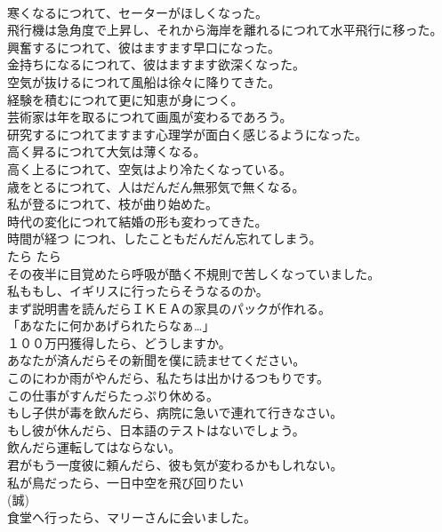 \documentclass[8pt]{extreport}
\begin{document}
\begin{CJK}{UTF8}{min}
\\	寒くなるにつれて、セーターがほしくなった。  
\\	飛行機は急角度で上昇し、それから海岸を離れるにつれて水平飛行に移った。   
\\	興奮するにつれて、彼はますます早口になった。   
\\	金持ちになるにつれて、彼はますます欲深くなった。   
\\	空気が抜けるにつれて風船は徐々に降りてきた。   
\\	経験を積むにつれて更に知恵が身につく。   
\\	芸術家は年を取るにつれて画風が変わるであろう。   
\\	研究するにつれてますます心理学が面白く感じるようになった。   
\\	高く昇るにつれて大気は薄くなる。   
\\	高く上るにつれて、空気はより冷たくなっている。   
\\	歳をとるにつれて、人はだんだん無邪気で無くなる。   
\\	私が登るにつれて、枝が曲り始めた。   
\\	時代の変化につれて結婚の形も変わってきた。  
\\	時間が経つ につれ、したこともだんだん忘れてしまう。  
\\	たら	たら	
\\	その夜半に目覚めたら呼吸が酷く不規則で苦しくなっていました。  
\\	私ももし、イギリスに行ったらそうなるのか。  
\\	まず説明書を読んだらＩＫＥＡの家具のパックが作れる。  
\\	「あなたに何かあげられたらなぁ…」  
\\	１００万円獲得したら、どうしますか。  
\\	あなたが済んだらその新聞を僕に読ませてください。  
\\	このにわか雨がやんだら、私たちは出かけるつもりです。  
\\	この仕事がすんだらたっぷり休める。  
\\	もし子供が毒を飲んだら、病院に急いで連れて行きなさい。  
\\	もし彼が休んだら、日本語のテストはないでしょう。  
\\	飲んだら運転してはならない。  
\\	君がもう一度彼に頼んだら、彼も気が変わるかもしれない。  
\\	私が鳥だったら、一日中空を飛び回りたい  
\\	(誠)
\\	食堂へ行ったら、マリーさんに会いました。   

\end{CJK}
\end{document}
